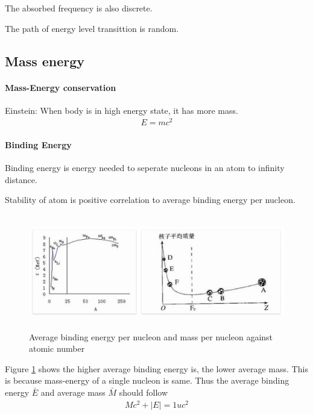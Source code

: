             The absorbed frequency is also discrete.

            The path of energy level transittion is random.

    \subsection{Mass energy}
        \paragraph{Mass-Energy conservation}
            Einstein: When body is in high energy state, it has more mass.
            \begin{align}
                E = mc^2
            \end{align}

        \paragraph{Binding Energy}
            Binding energy is energy needed to seperate nucleons in an atom to infinity distance.

            Stability of atom is positive correlation to average binding energy per nucleon.

            \begin{figure}[H]
                \begin{center}
                    \includegraphics[height=5cm]{nuclear_charts/bind_ener.eps}
                \end{center}
                \caption{Average binding energy per nucleon and mass per nucleon against atomic number}
                \label{be_ma_an}
            \end{figure}

            Figure \ref{be_ma_an} shows the higher average binding energy is, the lower average mass. This is because mass-energy of a single nucleon is same. Thus the average binding energy $\bar{E}$ and average mass $\bar{M}$ should follow
            \begin{align}
                M c^2 + |E| = 1u c^2
            \end{align}

